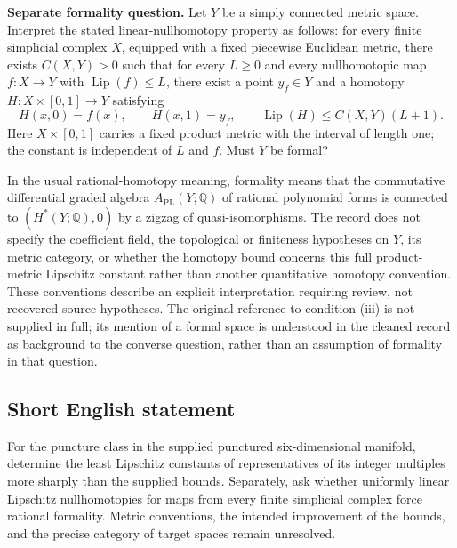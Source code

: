 \documentclass[11pt]{article}
\newcommand{\Q}{\mathbb{Q}}
\begin{document}
\textbf{Separate formality question.} Let \(Y\) be a simply connected metric space. Interpret the stated linear-nullhomotopy property as follows: for every finite simplicial complex \(X\), equipped with a fixed piecewise Euclidean metric, there exists \(C(X,Y)>0\) such that for every \(L\geq0\) and every nullhomotopic map \(f:X\to Y\) with \(\operatorname{Lip}(f)\leq L\), there exist a point \(y_f\in Y\) and a homotopy \(H:X\times[0,1]\to Y\) satisfying
\[
H(x,0)=f(x),\qquad H(x,1)=y_f,\qquad
\operatorname{Lip}(H)\leq C(X,Y)(L+1).
\]
Here \(X\times[0,1]\) carries a fixed product metric with the interval of length one; the constant is independent of \(L\) and \(f\). Must \(Y\) be formal?

In the usual rational-homotopy meaning, formality means that the commutative differential graded algebra \(A_{\mathrm{PL}}(Y;\Q)\) of rational polynomial forms is connected to \((H^{*}(Y;\Q),0)\) by a zigzag of quasi-isomorphisms. The record does not specify the coefficient field, the topological or finiteness hypotheses on \(Y\), its metric category, or whether the homotopy bound concerns this full product-metric Lipschitz constant rather than another quantitative homotopy convention. These conventions describe an explicit interpretation requiring review, not recovered source hypotheses. The original reference to condition (iii) is not supplied in full; its mention of a formal space is understood in the cleaned record as background to the converse question, rather than an assumption of formality in that question.
\subsection{Short English statement}
For the puncture class in the supplied punctured six-dimensional manifold, determine the least Lipschitz constants of representatives of its integer multiples more sharply than the supplied bounds. Separately, ask whether uniformly linear Lipschitz nullhomotopies for maps from every finite simplicial complex force rational formality. Metric conventions, the intended improvement of the bounds, and the precise category of target spaces remain unresolved.
\end{document}
